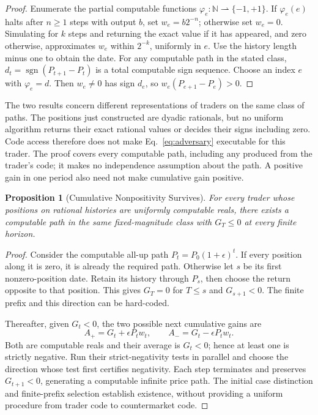 \documentclass[aps,pra,reprint,superscriptaddress,amsmath,amssymb,floatfix]{revtex4-2}
\theoremstyle{plain}
\newtheorem{proposition}[theorem]{Proposition}
\theoremstyle{definition}
\theoremstyle{remark}
\begin{document}
\begin{proof}
Enumerate the partial computable functions
\(\varphi_e\colon\mathbb N\rightharpoonup\{-1,+1\}\).
If \(\varphi_e(e)\) halts after \(n\geq1\) steps with output \(b\), set
\(w_e=b2^{-n}\); otherwise set \(w_e=0\).
Simulating for \(k\) steps and returning the exact value if it has appeared,
and zero otherwise, approximates \(w_e\) within \(2^{-k}\), uniformly in
\(e\). Use the history length minus one to obtain the date.
For any computable path in the stated class,
\(d_t=\operatorname{sgn}(P_{t+1}-P_t)\) is a total computable sign sequence.
Choose an index \(e\) with \(\varphi_e=d\). Then \(w_e\neq0\) has sign
\(d_e\), so \(w_e(P_{e+1}-P_e)>0\).
\end{proof}

The two results concern different representations of traders on the same
class of paths. The positions just constructed are dyadic rationals, but no
uniform algorithm returns their exact rational values or decides their signs
including zero. Code access therefore does not make
Eq.~\eqref{eq:adversary} executable for this trader. The proof covers every
computable path, including any produced from the trader's code; it makes no
independence assumption about the path. A positive gain in one period also
need not make cumulative gain positive.

\begin{proposition}[Cumulative Nonpositivity Survives]
\label{prop:real-cumulative}
For every trader whose positions on rational histories are uniformly
computable reals, there exists a computable path in the same fixed-magnitude
class with \(G_T\leq0\) at every finite horizon.
\end{proposition}

\begin{proof}
Consider the computable all-up path \(P_t=P_0(1+\epsilon)^t\).
If every position along it is zero, it is already the required path.
Otherwise let \(s\) be its first nonzero-position date. Retain its history
through \(P_s\), then choose the return opposite to that position.
This gives \(G_T=0\) for \(T\leq s\) and \(G_{s+1}<0\).
The finite prefix and this direction can be hard-coded.

Thereafter, given \(G_t<0\), the two possible next cumulative gains are
\[
  A_+=G_t+\epsilon P_tw_t,\qquad A_-=G_t-\epsilon P_tw_t.
\]
Both are computable reals and their average is \(G_t<0\); hence at least
one is strictly negative. Run their strict-negativity tests in parallel and
choose the direction whose test first certifies negativity. Each step
terminates and preserves \(G_{t+1}<0\), generating a computable infinite
price path. The initial case distinction and finite-prefix selection establish
existence, without providing a uniform procedure from trader code to
countermarket code.
\end{proof}
\end{document}
